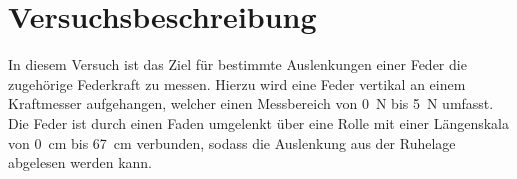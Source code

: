 \section{Versuchsbeschreibung}
\label{sec:Versuchsbeschreibung}

In diesem Versuch ist das Ziel für bestimmte Auslenkungen einer Feder die zugehörige Federkraft zu messen.
Hierzu wird eine Feder vertikal an einem Kraftmesser aufgehangen, welcher einen Messbereich von \SI{0}{\newton} bis \SI{5}{\newton} umfasst. 
Die Feder ist durch einen Faden umgelenkt über eine Rolle mit einer Längenskala von \SI{0}{\centi\meter} bis \SI{67}{\centi\meter} verbunden, sodass die Auslenkung aus der Ruhelage abgelesen werden kann.